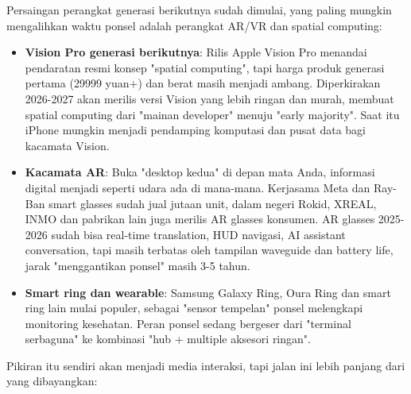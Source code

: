


Persaingan perangkat generasi berikutnya sudah dimulai, yang paling mungkin mengalihkan waktu ponsel adalah perangkat AR/VR dan spatial computing:

\begin{itemize}
  \item \textbf{Vision Pro generasi berikutnya}: Rilis Apple Vision Pro menandai pendaratan resmi konsep "spatial computing", tapi harga produk generasi pertama (29999 yuan+) dan berat masih menjadi ambang. Diperkirakan 2026-2027 akan merilis versi Vision yang lebih ringan dan murah, membuat spatial computing dari "mainan developer" menuju "early majority". Saat itu iPhone mungkin menjadi pendamping komputasi dan pusat data bagi kacamata Vision.
  \item \textbf{Kacamata AR}: Buka "desktop kedua" di depan mata Anda, informasi digital menjadi seperti udara ada di mana-mana. Kerjasama Meta dan Ray-Ban smart glasses sudah jual jutaan unit, dalam negeri Rokid, XREAL, INMO dan pabrikan lain juga merilis AR glasses konsumen. AR glasses 2025-2026 sudah bisa real-time translation, HUD navigasi, AI assistant conversation, tapi masih terbatas oleh tampilan waveguide dan battery life, jarak "menggantikan ponsel" masih 3-5 tahun.
  \item \textbf{Smart ring dan wearable}: Samsung Galaxy Ring, Oura Ring dan smart ring lain mulai populer, sebagai "sensor tempelan" ponsel melengkapi monitoring kesehatan. Peran ponsel sedang bergeser dari "terminal serbaguna" ke kombinasi "hub + multiple aksesori ringan".
\end{itemize}


Pikiran itu sendiri akan menjadi media interaksi, tapi jalan ini lebih panjang dari yang dibayangkan:

